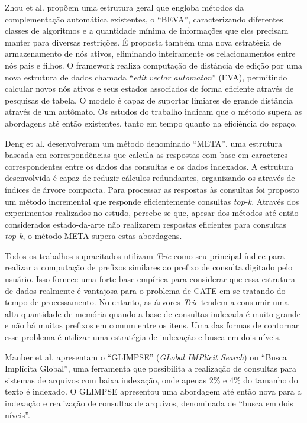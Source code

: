 Zhou et al. \citep{zhou2016beva} propõem uma estrutura geral que engloba métodos da complementação automática existentes, o ``BEVA'', caracterizando diferentes classes de algoritmos e a quantidade mínima de informações que eles precisam manter para diversas restrições. É proposta também uma nova estratégia de armazenamento de nós ativos, eliminando inteiramente os relacionamentos entre nós pais e filhos. O framework realiza computação de distância de edição por uma nova estrutura de dados chamada ``\textit{edit vector automaton}'' (EVA), permitindo calcular novos nós ativos e seus estados associados de forma eficiente através de pesquisas de tabela. O modelo é capaz de suportar limiares de grande distância através de um autômato. Os estudos do trabalho indicam que o método supera as abordagens até então existentes, tanto em tempo quanto na eficiência do espaço.

Deng et al. \citep{deng2016meta} desenvolveram um método denominado ``META'', uma estrutura baseada em correspondências que calcula as respostas com base em caracteres correspondentes entre os dados das consultas e os dados indexados. A estrutura desenvolvida é capaz de reduzir cálculos redundantes, organizando-os através de índices de árvore compacta. Para processar as respostas às consultas foi proposto um método incremental que responde eficientemente consultas \textit{top-k}. Através dos experimentos realizados no estudo, percebe-se que, apesar dos métodos até então considerados estado-da-arte não realizarem respostas eficientes para consultas \textit{top-k}, o método META supera estas abordagens.

Todos os trabalhos supracitados utilizam \textit{Trie} como seu principal índice para realizar a computação de prefixos similares ao prefixo de consulta digitado pelo usuário. Isso fornece uma forte base empírica para considerar que essa estrutura de dados realmente é vantajosa para o problema de CATE em se tratando do tempo de processamento. No entanto, as árvores \textit{Trie} tendem a consumir uma alta quantidade de memória quando a base de consultas indexada é muito grande e não há muitos prefixos em comum entre os itens. Uma das formas de contornar esse problema é utilizar uma estratégia de indexação e busca em dois níveis.

Manber et al. \citep{manber1994glimpse} apresentam o ``GLIMPSE'' (\textit{GLobal IMPlicit Search}) ou ``Busca Implícita Global'', uma ferramenta que possibilita a realização de consultas para sistemas de arquivos com baixa indexação, onde apenas 2\% e 4\% do tamanho do texto é indexado. O GLIMPSE apresentou uma abordagem até então nova para a indexação e realização de consultas de arquivos, denominada de ``busca em dois níveis''.

